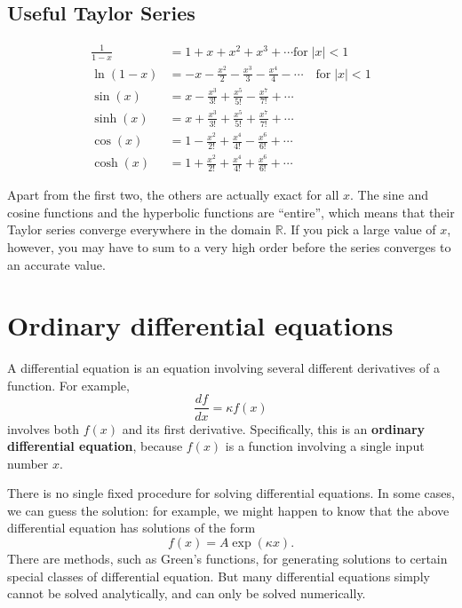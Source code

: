 \documentclass[10pt,a4paper]{article}
\begin{document}
\subsection{Useful Taylor Series}
\label{series}

\begin{align}
  \frac{1}{1-x} &= 1 + x + x^2 + x^3 + \cdots\mathrm{for} \; |x| < 1 \\
  \ln(1-x) &= -x - \frac{x^2}{2} - \frac{x^3}{3} - \frac{x^4}{4} - \cdots \quad \mathrm{for} \; |x| < 1 \\
  \sin(x) &= x - \frac{x^3}{3!} + \frac{x^5}{5!} - \frac{x^7}{7!} + \cdots \\
  \sinh(x) &= x + \frac{x^3}{3!} + \frac{x^5}{5!} + \frac{x^7}{7!} + \cdots \\
  \cos(x) &= 1 - \frac{x^2}{2!} + \frac{x^4}{4!} - \frac{x^6}{6!} + \cdots \\
  \cosh(x) &= 1 + \frac{x^2}{2!} + \frac{x^4}{4!} + \frac{x^6}{6!} + \cdots
\end{align}

Apart from the first two, the others are actually exact for all $x$.
The sine and cosine functions and the hyperbolic functions are
``entire'', which means that their Taylor series converge everywhere
in the domain $\mathbb{R}$.  If you pick a large value of $x$,
however, you may have to sum to a very high order before the series
converges to an accurate value.

\section{Ordinary differential equations}
\label{ordinary-differential-equations}

A differential equation is an equation involving several different
derivatives of a function. For example,
\begin{equation}
\frac{df}{dx} = \kappa f(x)
\label{ode_ex}
\end{equation}
involves both $f(x)$ and its first derivative. Specifically, this is
an \textbf{ordinary differential equation}, because $f(x)$ is a
function involving a single input number $x$.

There is no single fixed procedure for solving differential equations.
In some cases, we can guess the solution: for example, we might happen
to know that the above differential equation has solutions of the form
\begin{equation}
  f(x) = A \exp(\kappa x).
  \label{ode_sol}
\end{equation}
There are methods, such as Green's functions, for generating solutions
to certain special classes of differential equation. But many
differential equations simply cannot be solved analytically, and can
only be solved numerically.
\end{document}

